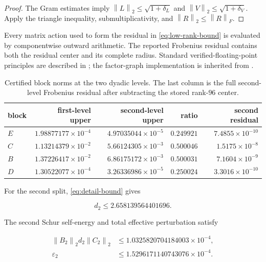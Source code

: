 \documentclass[11pt]{article}
\theoremstyle{definition}
\theoremstyle{remark}
\newcommand{\norm}[1]{\left\lVert #1\right\rVert}
\newcommand{\eps}{\varepsilon}
\begin{document}
\begin{proof}
The Gram estimates imply
$\norm{L}_2\le\sqrt{1+\delta_L}$ and
$\norm{V}_2\le\sqrt{1+\delta_V}$.  Apply the triangle inequality,
submultiplicativity, and \(\norm{R}_2\le\norm{R}_F\).
\end{proof}

Every matrix action used to form the residual in
\eqref{eq:low-rank-bound} is evaluated by componentwise outward arithmetic.
The reported Frobenius residual contains both the residual center and its
complete radius.  Standard verified-floating-point principles are described
in \citet{Higham2002,Rump2010}; the factor-graph implementation is inherited
from \citet{WangOutwardCode2026}.

\begin{table}[H]
\centering
\caption{Certified block norms at the two dyadic levels.  The last column is
the full second-level Frobenius residual after subtracting the stored
rank-$96$ center.}
\label{tab:blocks}
\begin{tabular}{lrrrr}
\toprule
block & first-level upper & second-level upper & ratio & second residual\\
\midrule
$E$ & $1.98877177\!\times10^{-4}$ & $4.97035044\!\times10^{-5}$ & $0.249921$ & $7.4855\!\times10^{-10}$\\
$C$ & $1.13214379\!\times10^{-2}$ & $5.66124305\!\times10^{-3}$ & $0.500046$ & $1.5175\!\times10^{-8}$\\
$B$ & $1.37226417\!\times10^{-2}$ & $6.86175172\!\times10^{-3}$ & $0.500031$ & $7.1604\!\times10^{-9}$\\
$D$ & $1.30522077\!\times10^{-4}$ & $3.26336986\!\times10^{-5}$ & $0.250024$ & $3.3016\!\times10^{-10}$\\
\bottomrule
\end{tabular}
\end{table}

For the second split, \eqref{eq:detail-bound} gives

\begin{equation}
 d_2\le2.658139564401696.
 \label{eq:d2}
\end{equation}

The second Schur self-energy and total effective perturbation satisfy

\begin{align}
 \norm{B_2}_2d_2\norm{C_2}_2
 &\le1.0325820704184003\times10^{-4},\label{eq:self2}\\
 \eps_2
 &\le1.5296171140743076\times10^{-4}.
 \label{eq:epsilon2}
\end{align}
\end{document}
